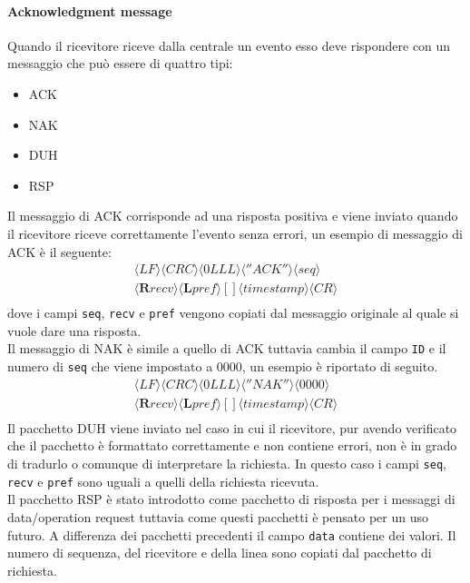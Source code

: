 \paragraph{Acknowledgment message}
Quando il ricevitore riceve dalla centrale un evento esso deve rispondere con un messaggio che può essere di quattro tipi:
\begin{itemize}
	\item ACK
	\item NAK
	\item DUH
	\item RSP
\end{itemize}
Il messaggio di ACK corrisponde ad una risposta positiva e viene inviato quando il ricevitore riceve correttamente l'evento senza errori, un esempio di messaggio di ACK è il seguente:
$$
\begin{array}{c}
\langle LF\rangle\langle CRC\rangle\langle 0LLL\rangle\langle ''ACK''\rangle\langle seq\rangle\\\langle\textbf{R}recv\rangle\langle\textbf{L}pref\rangle
{[]}\langle timestamp\rangle \langle CR\rangle\\
\end{array}	 
$$
dove i campi \texttt{seq}, \texttt{recv} e \texttt{pref} vengono copiati dal messaggio originale al quale si vuole dare una risposta.\\
Il messaggio di NAK è simile a quello di ACK tuttavia cambia il campo \texttt{ID} e il numero di \texttt{seq} che viene impostato a 0000, un esempio è riportato di seguito.
$$
\begin{array}{c}
\langle LF\rangle\langle CRC\rangle\langle 0LLL\rangle\langle ''NAK''\rangle\langle 0000\rangle\\\langle\textbf{R}recv\rangle\langle\textbf{L}pref\rangle
{[]}\langle timestamp\rangle \langle CR\rangle\\
\end{array}	 
$$
Il pacchetto DUH viene inviato nel caso in cui il ricevitore, pur avendo verificato che il pacchetto è formattato correttamente e non contiene errori, non è in grado di tradurlo o comunque di interpretare la richiesta. In questo caso i campi \texttt{seq}, \texttt{recv} e \texttt{pref} sono uguali a quelli della richiesta ricevuta.\\
Il pacchetto RSP è stato introdotto come pacchetto di risposta per i messaggi di data/operation request tuttavia come questi pacchetti è pensato per un uso futuro. A differenza dei pacchetti precedenti il campo \texttt{data} contiene dei valori. Il numero di sequenza, del ricevitore e della linea sono copiati dal pacchetto di richiesta.

